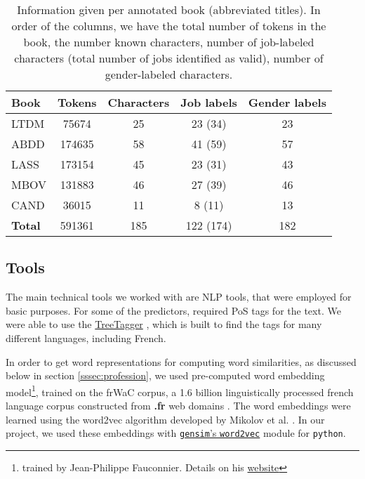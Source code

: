 \begin{table}
\centering
\begin{tabular}{|l||*{4}{c|} }
\hline
Book & Tokens & Characters & Job labels & Gender labels \\ \hline \hline
LTDM & 75674 & 25 & 23 (34) & 23 \\ \hline
ABDD & 174635 & 58 & 41 (59) & 57 \\ \hline
LASS & 173154 & 45 & 23 (31) & 43 \\ \hline
MBOV & 131883 & 46 & 27 (39) & 46 \\ \hline
CAND & 36015 & 11 & 8 (11) & 13 \\ \hline \hline
\bf Total & 591361 & 185 & 122 (174) & 182 \\ \hline
\end{tabular}
\caption{Information given per annotated book (abbreviated titles). In order of the columns, we have the total number of tokens in the book, the number known characters, number of job-labeled characters (total number of jobs identified as valid), number of gender-labeled characters.}
\label{tab:books}
\end{table}

\subsection{Tools}
The main technical tools we worked with are NLP tools, that were employed for basic purposes. For some of the predictors, required PoS tags for the text. We were able to use the \href{http://www.cis.uni-muenchen.de/~schmid/tools/TreeTagger/}{TreeTagger} \cite{schmid2013probabilistic}, which is built to find the tags for many different languages, including French. 

In order to get word representations for computing word similarities, as discussed below in section \cref{sssec:profession}, we used pre-computed word embedding model\footnote{trained by Jean-Philippe Fauconnier. Details on his \href{http://fauconnier.github.io/}{website}}, trained on the frWaC corpus, a 1.6 billion linguistically processed french language corpus constructed from \textbf{.fr} web domains \cite{baroni2009wacky}. The word embeddings were learned using the word2vec algorithm developed by Mikolov et al. \cite{mikolov2013distributed}. In our project, we used these embeddings with \href{https://radimrehurek.com/gensim/models/word2vec.html}{\texttt{gensim}'s \texttt{word2vec}} module for \texttt{python}.
